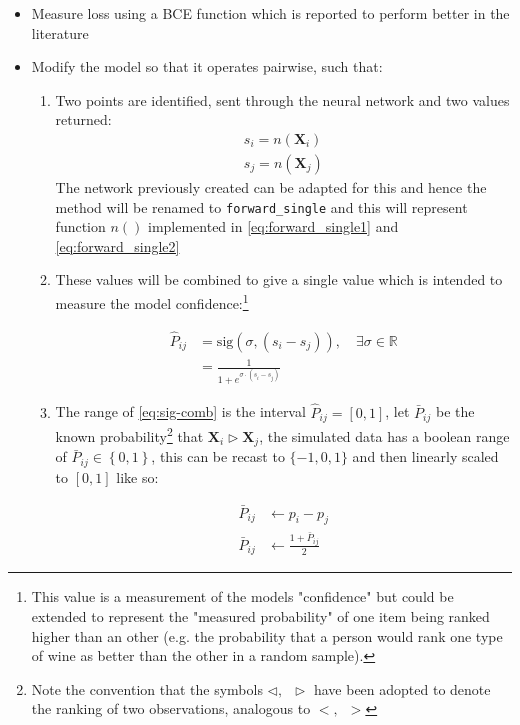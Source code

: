\documentclass[a4paper,11pt,twoside]{article}
\begin{document}
\begin{itemize}
\item Measure loss using a BCE function which is reported to perform better in the
literature \cite{christopherburgesRankNetRankingRetrospective2015,christopherburgesRankNetLambdaRankLambdaMART2010}
\item Modify the model so that it operates pairwise, such that:
\begin{enumerate}
\item Two points are identified, sent through the neural network and
two values returned:
\begin{align}
s_i = n(\mathbf{X}_i) \label{eq:forward_single1}\\
s_j = n(\mathbf{X}_j) \label{eq:forward_single2}
\end{align}
The network previously created can be adapted for this and
hence the method will be renamed to \texttt{forward\_single} and this
will represent function \(n()\) implemented in
\eqref{eq:forward_single1} and \eqref{eq:forward_single2}
\item These values will be combined to give a single value which is
intended to measure the model confidence:\footnote{This value is a measurement of the models "confidence" but
could be extended to represent the "measured probability" of one item
being ranked higher than an other (e.g. the probability that a person
would rank one type of wine as better than the other in a random
sample).}

\begin{align}
\hat{P}_{ij} &= \mathrm{sig}\left(\sigma, (s_i-s_j)\right), \quad
\exists \sigma \in \mathbb{R} \\
&= \frac{1}{1+e^{\sigma \cdot (s_i-s_j)}} \label{eq:sig-comb}
\end{align}
\item The range of \eqref{eq:sig-comb}  is the interval \(\hat{P}_{ij} =
        \left[0, 1\right]\), let \(\bar{P}_{ij}\) be the known
probability\footnote{Note the convention that the symbols \(\triangleleft, \enspace \triangleright\) have been adopted to denote the ranking of two observations,
analogous to \(<, \enspace >\)} that \(\mathbf{X}_i \triangleright
        \mathbf{X}_j\), the simulated data has a boolean range of
\(\bar{P}_{ij} \in \left\{0, 1\right\}\), this can be recast
to \(\{-1, 0, 1\}\) and then linearly scaled to \(\left[0,
        1\right]\) like so:

\begin{align}
\bar{P}_{ij} & \leftarrow p_i - p_j \\
\bar{P}_{ij} & \leftarrow \frac{1+\bar{P}_{ij}}{2}
\end{align}
\end{enumerate}
\end{itemize}
\end{document}

